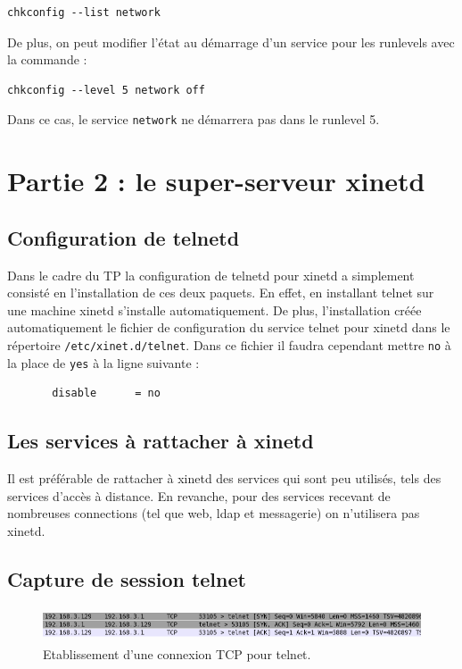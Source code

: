\documentclass[12pt,a4paper,notitlepage]{article}
\begin{document}
\begin{lstlisting}
chkconfig --list network
\end{lstlisting}
De plus, on peut modifier l'état au démarrage d'un service pour les runlevels avec la commande :
\begin{lstlisting}
chkconfig --level 5 network off
\end{lstlisting}
Dans ce cas, le service \texttt{network} ne démarrera pas dans le runlevel 5.


\section{Partie 2 : le super-serveur xinetd}
\subsection{Configuration de telnetd}
 
Dans le cadre du TP la configuration de telnetd pour xinetd a simplement consisté en l'installation de ces deux paquets. En effet, en installant telnet sur une machine xinetd s'installe automatiquement. De plus, l'installation créée automatiquement le fichier de configuration du service telnet pour xinetd dans le répertoire \texttt{/etc/xinet.d/telnet}. Dans ce fichier il faudra cependant mettre \texttt{no} à la place de \texttt{yes} à la ligne suivante :
\begin{lstlisting}
       disable		= no
\end{lstlisting}

\subsection{Les services à rattacher à xinetd}
Il est préférable de rattacher à xinetd des services qui sont peu utilisés, tels des services d'accès à distance. En revanche, pour des services recevant de nombreuses connections (tel que web, ldap et messagerie) on n'utilisera pas xinetd.

\subsection{Capture de session telnet}
\begin{figure}[!h]
\begin{center}
\includegraphics[height=1cm]{syn_ack.png}
\caption{Etablissement d'une connexion TCP pour telnet.}
\label{fig:do}
\end{center}
\end{figure}
\end{document}
